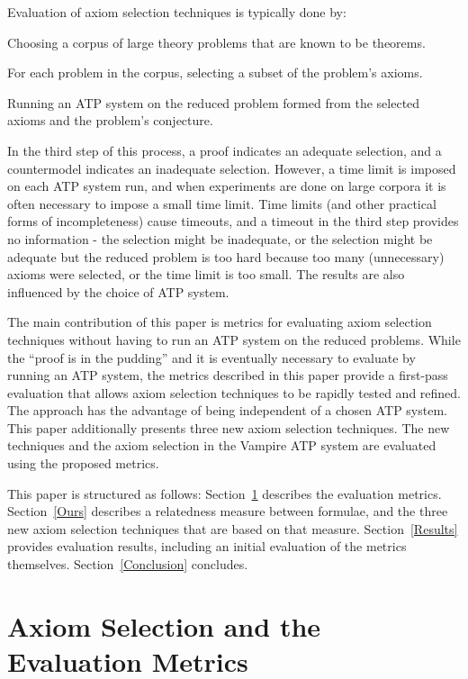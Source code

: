 \documentclass[EPiC]{easychair}
\newenvironment{packed_enumerate}{
\vspace*{-0.5em}
\begin{enumerate}
  \setlength{\partopsep}{0pt}
  \setlength{\itemsep}{1pt}
  \setlength{\parskip}{0pt}
  \setlength{\parsep}{0pt}
}{\end{enumerate}}
\begin{document}
Evaluation of axiom selection techniques is typically done by:
\begin{packed_enumerate}
\item Choosing a corpus of large theory problems that are known to be theorems.
\item For each problem in the corpus, selecting a subset of the problem's
      axioms.
\item Running an ATP system on the reduced problem formed from the selected 
      axioms and the problem's conjecture.
\end{packed_enumerate}
In the third step of this process, a proof indicates an adequate selection,
and a countermodel indicates an inadequate selection. 
However, a time limit is imposed on each ATP system run, and when experiments 
are done on large corpora it is often necessary to impose a small time limit.
Time limits (and other practical forms of incompleteness) cause timeouts, and 
a timeout in the third step provides no information - the selection might be 
inadequate, or the selection might be adequate but the reduced problem is 
too hard because too many (unnecessary) axioms were selected, or the time 
limit is too small.
The results are also influenced by the choice of ATP system.

The main contribution of this paper is metrics for evaluating axiom selection 
techniques without having to run an ATP system on the reduced problems.
While the ``proof is in the pudding'' and it is eventually necessary to
evaluate by running an ATP system, the metrics described in this paper
provide a first-pass evaluation that allows axiom selection techniques to
be rapidly tested and refined.
The approach has the advantage of being independent of a chosen ATP system.
This paper additionally presents three new axiom selection techniques. 
The new techniques and the axiom selection \cite{HV11} in the Vampire 
\cite{KV13} 
ATP system are evaluated using the proposed metrics.

This paper is structured as follows:
Section~\ref{Metrics} describes the evaluation metrics.
Section~\ref{Ours} describes a relatedness measure between formulae, and
the three new axiom selection techniques that are based on that measure.
Section~\ref{Results} provides evaluation results, including an initial 
evaluation of the metrics themselves.
Section~\ref{Conclusion} concludes.

\section{Axiom Selection and the Evaluation Metrics}
\label{Metrics}
\end{document}
